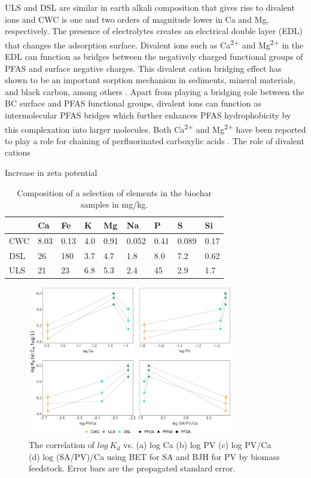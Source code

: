 ULS and DSL are similar in earth alkali composition that gives rise to divalent ions  and CWC is one and two orders of magnitude lower in Ca and Mg, respectively. The presence of electrolytes creates an electrical double layer (EDL) that changes the adsorption surface. Divalent ions such as Ca\textsuperscript{2+} and Mg\textsuperscript{2+} in the EDL can function as bridges between the negatively charged functional groups of PFAS and surface negative charges. This divalent cation bridging effect has shown to be an important sorption mechanism in sediments, mineral materials, and black carbon, among others \citep{higgins2006sorption}. Apart from playing a bridging role between the BC surface and PFAS functional groups, divalent ions can function as intermolecular PFAS bridges which further enhances PFAS hydrophobicity by this complexation into larger molecules. Both Ca\textsuperscript{2+} and Mg\textsuperscript{2+} have been reported to play a role for chaining of perfluorinated carboxylic acids \citep{wang2011}. The role of divalent cations  

Increase in zeta potential 

\begin{table}
\centering
\caption{Composition of a selection of elements in the biochar samples in mg/kg.}
\label{tab:BC_mainElements}
\begin{tabular}{lllllllll} \toprule
 & Ca & Fe & K & Mg & Na & P & S & Si \\ \midrule
CWC & 8.03 & 0.13 & 4.0 & 0.91 & 0.052 & 0.41 & 0.089 & 0.17 \\
DSL & 26 & 180 & 3.7 & 4.7 & 1.8 & 8.0 & 7.2 & 0.62 \\
ULS & 21 & 23 & 6.8 & 5.3 & 2.4 & 45 & 2.9 & 1.7 \\ \bottomrule
\end{tabular}
\end{table}

\begin{figure}[htb]
    \centering
    \includegraphics[width=0.8\textwidth]{R/figs/Correlation_SAPV_Ca_plot.pdf}
    \caption{The correlation of $log~K_d$ vs. (a) log Ca (b) log PV (c) log PV/Ca (d) log (SA/PV)/Ca using BET for SA and BJH for PV by biomass feedstock. Error bars are the propagated standard error.}
    \label{fig:Kd_SAPV_Ca}
\end{figure}

